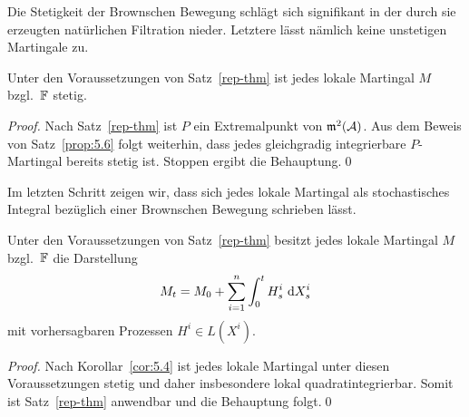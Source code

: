 Die Stetigkeit der Brownschen Bewegung schlägt sich signifikant in der durch sie
erzeugten natürlichen Filtration nieder. Letztere lässt nämlich keine unstetigen
Martingale zu.

\begin{korollar}
\label{cor:5.4}
Unter den Voraussetzungen von Satz~\ref{rep-thm} ist jedes lokale
Martingal $M$ bzgl.\ $\mathbb{F}$ stetig.\fish
\end{korollar}
\begin{proof}
Nach Satz~\ref{rep-thm} ist $P$ ein Extremalpunkt von $\mathfrak{m}^2(\mathcal{A})$. Aus dem
Beweis von Satz~\ref{prop:5.6} folgt weiterhin, dass jedes gleichgradig
integrierbare $P$-Martingal bereits stetig ist. Stoppen ergibt die
Behauptung.\qed
\end{proof}

Im letzten Schritt zeigen wir, dass sich jedes lokale Martingal als
stochastisches Integral bezüglich einer Brownschen Bewegung schrieben lässt.

\begin{korollar}
Unter den Voraussetzungen von Satz~\ref{rep-thm} besitzt jedes lokale Martingal
$M$ bzgl.\ $\mathbb{F}$ die Darstellung
\begin{align*}
M_t=M_0+ \sum_{i=1}^n \int_0^t H_s^i \,\,\mathrm{d} X_s^i
\end{align*}
mit vorhersagbaren Prozessen $H^i\in L(X^i)$.\fish
\end{korollar}
\begin{proof}
Nach Korollar~\ref{cor:5.4} ist jedes lokale Martingal unter diesen
Voraussetzungen stetig und daher insbesondere lokal quadratintegrierbar. Somit ist
Satz~\ref{rep-thm} anwendbar und die Behauptung folgt.\qed
\end{proof}


